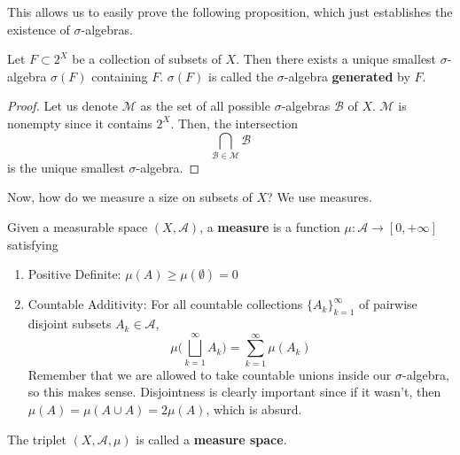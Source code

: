 \documentclass{article}
\begin{document}
    This allows us to easily prove the following proposition, which just establishes the existence of $\sigma$-algebras. 

    \begin{proposition}
      Let $F \subset 2^X$ be a collection of subsets of $X$. Then there exists a unique smallest $\sigma$-algebra $\sigma(F)$ containing $F$. $\sigma(F)$ is called the $\sigma$-algebra \textbf{generated} by $F$. 
    \end{proposition}
    \begin{proof}
      Let us denote $\mathcal{M}$ as the set of all possible $\sigma$-algebras $\mathcal{B}$ of $X$. $\mathcal{M}$ is nonempty since it contains $2^X$. Then, the intersection 
      \begin{equation}
        \bigcap_{\mathcal{B} \in \mathcal{M}} \mathcal{B}
      \end{equation}
      is the unique smallest $\sigma$-algebra. 
    \end{proof}

    Now, how do we measure a size on subsets of $X$? We use measures. 

    \begin{definition}[Measure]
      Given a measurable space $(X, \mathcal{A})$, a \textbf{measure} is a function $\mu : \mathcal{A} \longrightarrow [0, +\infty]$ satisfying 
      \begin{enumerate}
        \item Positive Definite: $\mu(A) \geq \mu(\emptyset) = 0$ 
        \item Countable Additivity: For all countable collections $\{A_k\}_{k=1}^\infty$ of pairwise disjoint subsets $A_k \in \mathcal{A}$, 
        \begin{equation}
          \mu \bigg( \bigsqcup_{k=1}^\infty A_k \bigg) = \sum_{k=1}^\infty \mu(A_k)
        \end{equation}
        Remember that we are allowed to take countable unions inside our $\sigma$-algebra, so this makes sense. Disjointness is clearly important since if it wasn't, then $\mu(A) = \mu(A \cup A) = 2 \mu(A)$, which is absurd. 
      \end{enumerate}
      The triplet $(X, \mathcal{A}, \mu)$ is called a \textbf{measure space}. 
    \end{definition}
\end{document}
